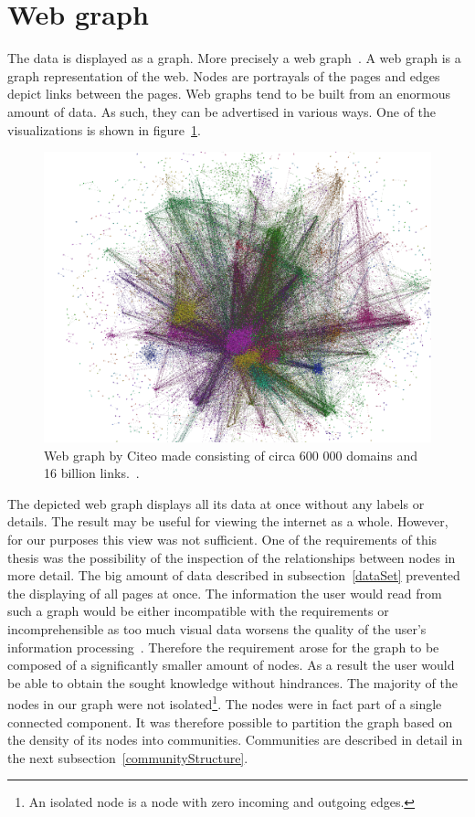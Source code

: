 \section{Web graph} \label{webGraph}
The data is displayed as a graph. More precisely a web graph~\cite{the_web_graph_overview}. A web graph is a graph representation of the web. Nodes are portrayals of the pages and edges depict links between the pages. Web graphs tend to be built from an enormous amount of data. As such, they can be advertised in various ways. One of the visualizations is shown in figure~\ref{hugeWebGraphFireworks}. 
\begin{figure}[ht!]
  \centering
  \includegraphics[width=\textwidth]{Images/hugeWebGraphFireworks.png}
  \caption{Web graph by Citeo made consisting of circa 600 000 domains and 16 billion links.~\cite{hugeWebGraphFireworks}.}
  \label{hugeWebGraphFireworks}
\end{figure} 
The depicted web graph displays all its data at once without any labels or details. The result may be useful for viewing the internet as a whole. However, for our purposes this view was not sufficient. One of the requirements of this thesis was the possibility of the inspection of the relationships between nodes in more detail. The big amount of data described in subsection~\ref{dataSet} prevented the displaying of all pages at once. The information the user would read from such a graph would be either incompatible with the requirements or incomprehensible as too much visual data worsens the quality of the user's information processing~\cite{informationCluttering}. Therefore the requirement arose for the graph to be composed of a significantly smaller amount of nodes. As a result the user would be able to obtain the sought knowledge without hindrances. The majority of the nodes in our graph were not isolated\footnote{An isolated node is a node with zero incoming and outgoing edges.}. The nodes were in fact part of a single connected component. It was therefore possible to partition the graph based on the density of its nodes into communities. Communities are described in detail in the next subsection~\ref{communityStructure}.

